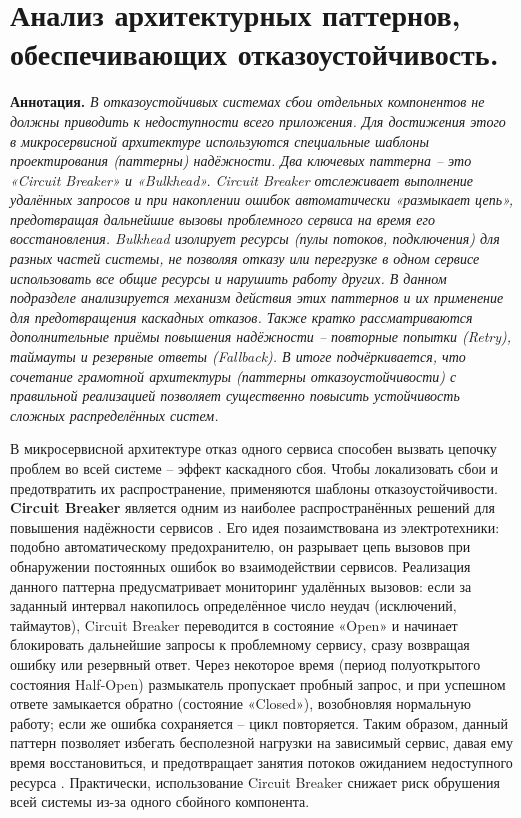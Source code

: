 \section{Анализ архитектурных паттернов, обеспечивающих отказоустойчивость.}
\textbf{Аннотация. }\textit{В отказоустойчивых системах сбои отдельных компонентов не должны приводить к недоступности всего приложения. Для достижения этого в микросервисной архитектуре используются специальные шаблоны проектирования (паттерны) надёжности. Два ключевых паттерна – это «Circuit Breaker» и «Bulkhead». Circuit Breaker отслеживает выполнение удалённых запросов и при накоплении ошибок автоматически «размыкает цепь», предотвращая дальнейшие вызовы проблемного сервиса на время его восстановления. Bulkhead изолирует ресурсы (пулы потоков, подключения) для разных частей системы, не позволяя отказу или перегрузке в одном сервисе использовать все общие ресурсы и нарушить работу других. В данном подразделе анализируется механизм действия этих паттернов и их применение для предотвращения каскадных отказов. Также кратко рассматриваются дополнительные приёмы повышения надёжности – повторные попытки (Retry), таймауты и резервные ответы (Fallback). В итоге подчёркивается, что сочетание грамотной архитектуры (паттерны отказоустойчивости) с правильной реализацией позволяет существенно повысить устойчивость сложных распределённых систем.}

В микросервисной архитектуре отказ одного сервиса способен вызвать цепочку проблем во всей системе – эффект каскадного сбоя. Чтобы локализовать сбои и предотвратить их распространение, применяются шаблоны отказоустойчивости. \textbf{Circuit Breaker}  является одним из наиболее распространённых решений для повышения надёжности сервисов \cite{Newman2021}. Его идея позаимствована из электротехники: подобно автоматическому предохранителю, он разрывает цепь вызовов при обнаружении постоянных ошибок во взаимодействии сервисов. Реализация данного паттерна предусматривает мониторинг удалённых вызовов: если за заданный интервал накопилось определённое число неудач (исключений, таймаутов), Circuit Breaker переводится в состояние «Open» и начинает блокировать дальнейшие запросы к проблемному сервису, сразу возвращая ошибку или резервный ответ. Через некоторое время (период полуоткрытого состояния Half-Open) размыкатель пропускает пробный запрос, и при успешном ответе замыкается обратно (состояние «Closed»), возобновляя нормальную работу; если же ошибка сохраняется – цикл повторяется. Таким образом, данный паттерн позволяет избегать бесполезной нагрузки на зависимый сервис, давая ему время восстановиться, и предотвращает занятия потоков ожиданием недоступного ресурса \cite{Punithavathy2024}. Практически, использование Circuit Breaker снижает риск обрушения всей системы из-за одного сбойного компонента.

